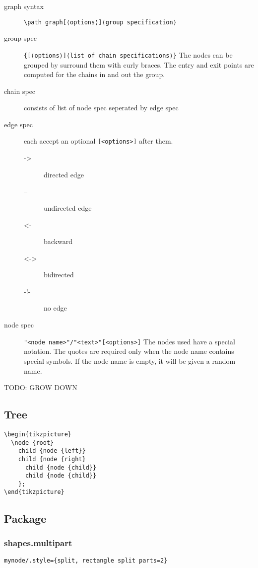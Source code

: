 \begin{description}
\item [graph syntax] \verb$\path graph[⟨options⟩]⟨group specification⟩$
\item [group spec] \verb${[⟨options⟩]⟨list of chain specifications⟩}$
  The nodes can be grouped by surround them with curly braces. The
  entry and exit points are computed for the chains in and out the
  group.

\item [chain spec] consists of list of node spec seperated by edge
  spec
\item [edge spec] each accept an optional \texttt{[<options>]} after them.
  \begin{description}
  \item [->] directed edge
  \item [--] undirected edge
  \item [<-] backward
  \item [<->] bidirected
  \item [-!-] no edge
  \end{description}
\item [node spec] \verb$"<node name>"/"<text>"[<options>]$ The nodes
  used have a special notation. The quotes are required only when the
  node name contains special symbols. If the node name is empty, it
  will be given a random name.
\end{description}

TODO: GROW DOWN

\subsection{Tree}

\begin{lstlisting}
\begin{tikzpicture}
  \node {root}
    child {node {left}}
    child {node {right}
      child {node {child}}
      child {node {child}}
    };
\end{tikzpicture}
\end{lstlisting}

\subsection{Package}
\subsubsection{shapes.multipart}
\begin{lstlisting}
mynode/.style={split, rectangle split parts=2}
\end{lstlisting}
